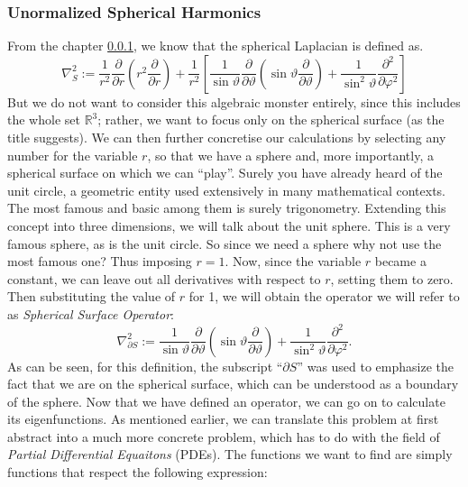 \subsubsection{Unormalized Spherical Harmonics}
From the chapter \ref{}, we know that the spherical Laplacian is defined as. \begin{equation*}
    \nabla^2_S := \frac{1}{r^2} \frac{\partial}{\partial r} \left( r^2 \frac{\partial}{\partial r} \right) + \frac{1}{r^2} 
    \left[
        \frac{1}{\sin\vartheta} \frac{\partial}{\partial \vartheta} \left( \sin\vartheta \frac{\partial}{\partial\vartheta} \right)
                + \frac{1}{\sin^2 \vartheta} \frac{\partial^2}{\partial\varphi^2}
    \right] 
\end{equation*}
But we do not want to consider this algebraic monster entirely, since this includes the whole set $\mathbb{R}^3$; rather, we want to focus only on the spherical surface (as the title suggests). We can then further concretise our calculations by selecting any number for the variable $r$, so that we have a sphere and, more importantly, a spherical surface on which we can ``play''.\newline
Surely you have already heard of the unit circle, a geometric entity used extensively in many mathematical contexts. The most famous and basic among them is surely trigonometry.\newline
Extending this concept into three dimensions, we will talk about the unit sphere. This is a very famous sphere, as is the unit circle. So since we need a sphere why not use the most famous one? Thus imposing $r=1$.\newline
Now, since the variable $r$ became a constant, we can leave out all derivatives with respect to $r$, setting them to zero. Then substituting the value of $r$ for 1, we will obtain the operator we will refer to as \emph{Spherical Surface Operator}:
\begin{equation*}
    \nabla^2_{\partial S} := \frac{1}{\sin\vartheta} \frac{\partial}{\partial \vartheta} \left( \sin\vartheta \frac{\partial}{\partial\vartheta} \right)
                + \frac{1}{\sin^2 \vartheta} \frac{\partial^2}{\partial\varphi^2}.
\end{equation*}
As can be seen, for this definition, the subscript ``$\partial S$'' was used to emphasize the fact that we are on the spherical surface, which can be understood as a boundary of the sphere.\newline
Now that we have defined an operator, we can go on to calculate its eigenfunctions. As mentioned earlier, we can translate this problem at first abstract into a much more concrete problem, which has to do with the field of \emph{Partial Differential Equaitons} (PDEs). The functions we want to find are simply functions that respect the following expression:
